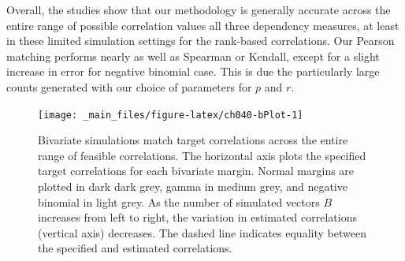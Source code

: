\documentclass[
]{jss}
\begin{document}
Overall, the studies show that our methodology is generally accurate across the entire range of possible correlation values all three dependency measures, at least in these limited simulation settings for the rank-based correlations. Our Pearson matching performs nearly as well as Spearman or Kendall, except for a slight increase in error for negative binomial case. This is due the particularly large counts generated with our choice of parameters for \(p\) and \(r\).

\begin{CodeChunk}
\begin{figure}

{\centering \texttt{[image: \_main\_files/figure-latex/ch040-bPlot-1]} 

}

\caption[Bivariate simulations match target correlations across the entire range of feasible correlations]{Bivariate simulations match target correlations across the entire range of feasible correlations. The horizontal axis plots the specified target correlations for each bivariate margin. Normal margins are plotted in dark dark grey, gamma in medium grey, and negative binomial in light grey. As the number of simulated vectors $B$ increases from left to right, the variation in estimated correlations (vertical axis) decreases. The dashed line indicates equality between the specified and estimated correlations.}\label{fig:ch040-bPlot}
\end{figure}
\end{CodeChunk}
\end{document}
